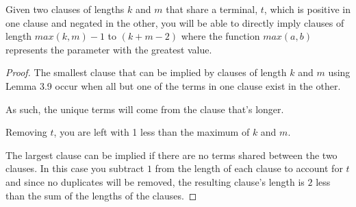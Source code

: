 \documentclass[manuscript]{acmart}
\begin{document}
    \begin{lemma}
        Given two clauses of lengths $k$ and $m$ that share a terminal, $t$, which is 
        positive in one clause and negated in the other, you will be able
        to directly imply clauses of length $max(k, m)-1$ to $(k + m - 2)$ where
        the function $max(a, b)$ represents the parameter with the greatest value.
    \end{lemma}
    \begin{proof}
        The smallest clause that can be implied by clauses of length $k$ and $m$
        using Lemma 3.9 occur when all but one of the terms in one clause exist in the other.

        As such, the unique terms will come from the clause that's longer.

        Removing $t$, you are left with 1 less than the maximum of $k$ and $m$.

        The largest clause can be implied if there are no terms shared between
        the two clauses. In this case you subtract $1$ from the length of each
        clause to account for $t$ and since no duplicates will be removed, the 
        resulting clause's length is $2$ less than the sum of the lengths of 
        the clauses.
    \end{proof}
\end{document}
